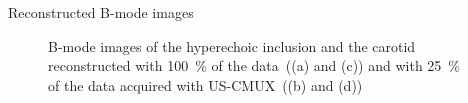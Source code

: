{\begin{block}{Reconstructed B-mode images}
\begin{figure}
		\caption{B-mode images of the hyperechoic inclusion and the carotid reconstructed with \SI{100}{\percent} of the data~((a) and (c)) and with \SI{25}{\percent} of the data acquired with US-CMUX~((b) and (d))}
	\end{figure}
	

\end{block}}

